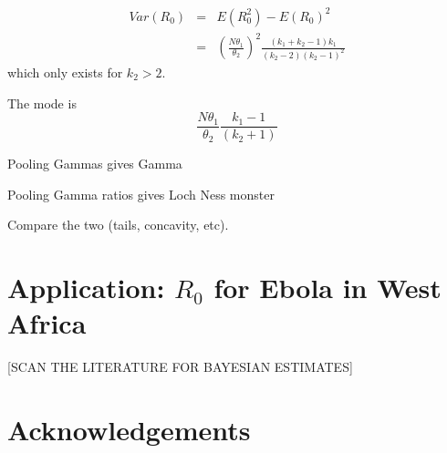 \documentclass[a4paper, notitlepage, 10pt]{article}
\begin{document}
\begin{eqnarray}
\label{eq:var1}
Var(R_0) &=& E(R_0^2) - E(R_0)^2  \\
\label{eq:var2}
 &=& \left(\frac{N\theta_1}{\theta_2}\right)^2\frac{(k_1+k_2-1)k_1}{(k_2-2)(k_2-1)^2}
\end{eqnarray}
which only exists for $k_2 > 2$.

The mode is 
\begin{equation}
\label{eq:mode}
\frac{N\theta_1}{\theta_2}\frac{k_1 - 1}{(k_2 + 1)}
\end{equation}

Pooling Gammas gives Gamma

Pooling Gamma ratios gives Loch Ness monster

Compare the two (tails, concavity, etc).




\section{Application: $R_0$ for Ebola in West Africa}
[SCAN THE LITERATURE FOR BAYESIAN ESTIMATES]
\section*{Acknowledgements}


\end{document}
